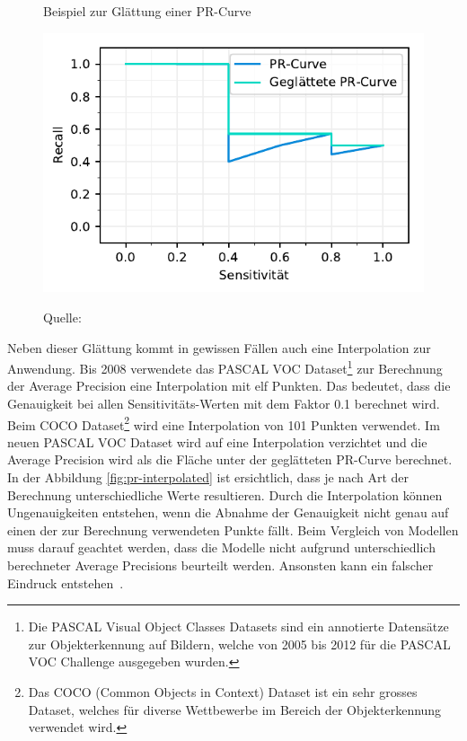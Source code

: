 \begin{figure}[h!]
    \captionsetup{width=.9\linewidth}
    \caption{Beispiel zur Glättung einer PR-Curve}
    \label{fig:pr-smoothed}
    \centering
    \includegraphics[scale=1]{graphics/matplot/ap__pr-smoothed.pdf}\\
    \caption*{Quelle: \textcite{AP}}
\end{figure}

Neben dieser Glättung kommt in gewissen Fällen auch eine Interpolation zur Anwendung. Bis 2008 verwendete das PASCAL VOC Dataset\footnote{Die PASCAL Visual Object Classes Datasets sind ein annotierte Datensätze zur Objekterkennung auf Bildern, welche von 2005 bis 2012 für die PASCAL VOC Challenge ausgegeben wurden.} zur Berechnung der Average Precision eine Interpolation mit elf Punkten. Das bedeutet, dass die Genauigkeit bei allen Sensitivitäts-Werten mit dem Faktor 0.1 berechnet wird. Beim COCO Dataset\footnote{Das COCO (Common Objects in Context) Dataset ist ein sehr grosses Dataset, welches für diverse Wettbewerbe im Bereich der Objekterkennung verwendet wird.} wird eine Interpolation von 101 Punkten verwendet. Im neuen PASCAL VOC Dataset wird auf eine Interpolation verzichtet und die Average Precision wird als die Fläche unter der geglätteten PR-Curve berechnet. In der Abbildung \ref{fig:pr-interpolated} ist ersichtlich, dass je nach Art der Berechnung unterschiedliche Werte resultieren. Durch die Interpolation können Ungenauigkeiten entstehen, wenn die Abnahme der Genauigkeit nicht genau auf einen der zur Berechnung verwendeten Punkte fällt. Beim Vergleich von Modellen muss darauf geachtet werden, dass die Modelle nicht aufgrund unterschiedlich berechneter Average Precisions beurteilt werden. Ansonsten kann ein falscher Eindruck entstehen~\autocite{AP}.

